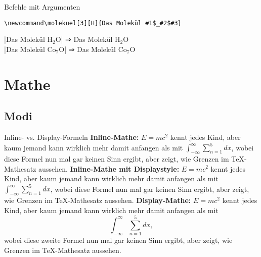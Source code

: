 \documentclass[
	vorläufig=false,
	datum=2017-11-03,
	titel={Mathematiksatz I},
	web=false,
	mo,
	aspectratio=1610,
]{../tex/latexkurs-slides}
\begin{document}
\begin{frame}[fragile]{Befehle mit Argumenten}
\begin{lstlisting}
\newcommand\molekuel[3][H]{Das Molekül #1$_#2$#3}
\end{lstlisting}
\newcommand\molekuel[3][H]{Das Molekül #1$_#2$#3}
|\molekuel{2}{O}| ⇒ \molekuel{2}{O}\\
|\molekuel[Co]{7}{O}| ⇒ \molekuel[Co]{7}{O}\\
\end{frame}


\section{Mathe}
\subsection{Modi}


\begin{frame}{Inline- vs. Display-Formeln}
\rmfamily
\textbf{Inline-Mathe:} $E=mc^2$ kennt jedes Kind, aber kaum jemand kann wirklich mehr damit anfangen als mit $\int^\infty_{-\infty}\sum_{n = 1}^5 dx$, wobei diese Formel nun mal gar keinen Sinn ergibt, aber zeigt, wie Grenzen im \TeX-Mathesatz aussehen.
\textbf{Inline-Mathe mit Displaystyle:} $E=mc^2$ kennt jedes Kind, aber kaum jemand kann wirklich mehr damit anfangen als mit $\displaystyle \int^\infty_{-\infty}\sum_{n = 1}^5 dx$, wobei diese Formel nun mal gar keinen Sinn ergibt, aber zeigt, wie Grenzen im \TeX-Mathesatz aussehen.
\textbf{Display-Mathe:} $E=mc^2$ kennt jedes Kind, aber kaum jemand kann wirklich mehr damit anfangen als mit \[\int^\infty_{-\infty}\sum_{n = 1}^5 dx,\] wobei diese zweite Formel nun mal gar keinen Sinn ergibt, aber zeigt, wie Grenzen im \TeX-Mathesatz aussehen.
\end{frame}
\end{document}
